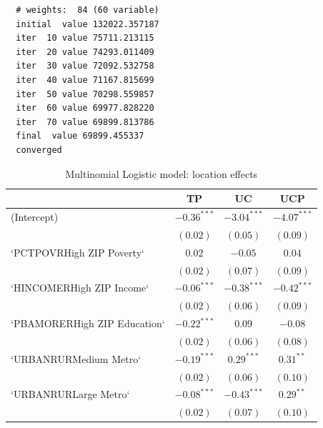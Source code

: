 \documentclass[12pt,twoside]{reedthesis}
\begin{document}
  \begin{verbatim}
  # weights:  84 (60 variable)
  initial  value 132022.357187 
  iter  10 value 75711.213115
  iter  20 value 74293.011409
  iter  30 value 72092.532758
  iter  40 value 71167.815699
  iter  50 value 70298.559857
  iter  60 value 69977.828220
  iter  70 value 69899.813786
  final  value 69899.455337 
  converged
  \end{verbatim}
  
  \singlespacing
  
  \begin{table}
  \caption{Multinomial Logistic model: location effects}
  \begin{center}
  \begin{footnotesize}
  \begin{tabular}{l c c c }
  \hline
   & TP & UC & UCP \\
  \hline
  (Intercept)                  & $\mathbf{-0.36}^{***}$ & $\mathbf{-3.04}^{***}$ & $\mathbf{-4.07}^{***}$ \\
                               & $(0.02)$               & $(0.05)$               & $(0.09)$               \\
  `PCTPOVRHigh ZIP Poverty`    & $0.02$                 & $-0.05$                & $0.04$                 \\
                               & $(0.02)$               & $(0.07)$               & $(0.09)$               \\
  `HINCOMERHigh ZIP Income`    & $\mathbf{-0.06}^{***}$ & $\mathbf{-0.38}^{***}$ & $\mathbf{-0.42}^{***}$ \\
                               & $(0.02)$               & $(0.06)$               & $(0.09)$               \\
  `PBAMORERHigh ZIP Education` & $\mathbf{-0.22}^{***}$ & $0.09$                 & $-0.08$                \\
                               & $(0.02)$               & $(0.06)$               & $(0.08)$               \\
  `URBANRURMedium Metro`       & $\mathbf{-0.19}^{***}$ & $\mathbf{0.29}^{***}$  & $0.31^{**}$            \\
                               & $(0.02)$               & $(0.06)$               & $(0.10)$               \\
  `URBANRURLarge Metro`        & $\mathbf{-0.08}^{***}$ & $\mathbf{-0.43}^{***}$ & $0.29^{**}$            \\
                               & $(0.02)$               & $(0.07)$               & $(0.10)$               \\

\end{tabular}
\end{footnotesize}
\end{center}
\end{table}
\end{document}
